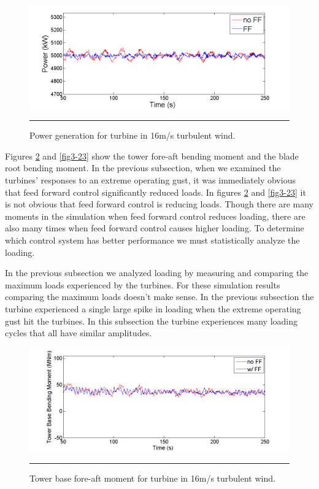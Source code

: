 \begin{figure}[htbp]
	\centering
		\includegraphics[trim = {1cm 0 2cm 0}, clip, width = \linewidth]{Figures/ch3Figures/fig3-21.png}
		\rule{35em}{0.5pt}
	\caption{Power generation for turbine in 16m/s turbulent wind.}
	\label{fig3-21}
\end{figure}

Figures \ref{fig3-22} and \ref{fig3-23} show the tower fore-aft bending moment and the blade root bending moment. In the previous subsection, when we examined the turbines' responses to an extreme operating gust, it was immediately obvious that feed forward control significantly reduced loads. In figures \ref{fig3-22} and \ref{fig3-23} it is not obvious that feed forward control is reducing loads. Though there are many moments in the simulation when feed forward control reduces loading, there are also many times when feed forward control causes higher loading. To determine which control system has better performance we must statistically analyze the loading.

In the previous subsection we analyzed loading by measuring and comparing the maximum loads experienced by the turbines. For these simulation results comparing the maximum loads doesn't make sense. In the previous subsection the turbine experienced a single large spike in loading when the extreme operating gust hit the turbines. In this subsection the turbine experiences many loading cycles that all have similar amplitudes. 


\begin{figure}[htbp]
	\centering
		\includegraphics[trim = {1cm 0 2cm 0}, clip, width = \linewidth]{Figures/ch3Figures/fig3-22.png}
		\rule{35em}{0.5pt}
	\caption{Tower base fore-aft moment for turbine in 16m/s turbulent wind.}
	\label{fig3-22}
\end{figure}

